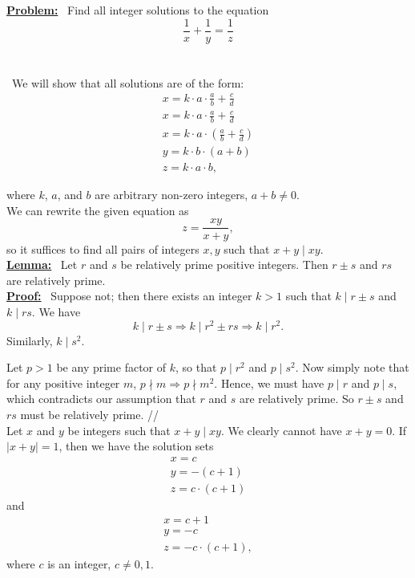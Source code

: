 \documentclass[11pt]{article}
\begin{document}
\Large\underline{\textbf{Problem:}} \ Find all integer solutions to the equation
$$ \frac{1}{x} + \frac{1}{y} = \frac{1}{z} $$
\\
\\

\noindent \ We will show that all solutions are of the form:
\begin{eqnarray}
	x = k \cdot a \cdot \displaystyle \frac{a}{b} + \frac{c}{d} \\
	x = k \cdot a \cdot \displaystyle \frac{a}{b} + \frac{c}{d} \\
	x = k \cdot a \cdot \displaystyle (\frac{a}{b} + \frac{c}{d}) \\
	y = k \cdot b \cdot \left(a + b\right) \\
	z = k \cdot a \cdot b,
\end{eqnarray} 

\noindent where $k$, $a$, and $b$ are arbitrary non-zero integers, $a+b\neq0$. \\

\noindent  We can rewrite the given equation as
$$ z = \frac{xy}{x+y}, $$
so it suffices to find all pairs of integers $ x, y $ such that $x+y \mid xy$. \\

\noindent  \underline{\textbf{Lemma:}} \ Let $r$ and $s$ be relatively prime positive integers.  Then $r\pm s$ and $rs$ are relatively prime. \\

\noindent  \underline{\textbf{Proof:}} \ Suppose not; then there exists an integer $k > 1$ such that $k \mid r\pm s$ and $k \mid rs$.  We have \\  

\noindent  \[ k \mid r \pm s \Rightarrow k \mid r^2 \pm rs \Rightarrow k \mid r^2. \]
Similarly, $ k \mid s^2. $

Let $p > 1$ be any prime factor of $k$, so that $p \mid r^2$ and $p \mid s^2$.  
Now simply note that for any positive integer $m$, $ p \nmid m \Rightarrow p \nmid m^2$. 
Hence, we must have $p \mid r$ and $p \mid s$, which contradicts our assumption that $r$ and $s$ are relatively prime.  So $r \pm s$ and $rs$ must be relatively prime. // \\

Let $x$ and $y$ be integers such that $x+y \mid xy$.  We clearly cannot have $x+y = 0$.
If $\left|x+y\right| = 1$, then we have the solution sets
$$ \begin{array}{l}
	x = c \\
	y = -\left(c + 1\right) \\
	z = c\cdot\left(c+1\right)
\end{array} $$
and
$$ \begin{array}{l}
	x = c+1 \\
	y = -c \\
	z = -c\cdot\left(c+1\right),
\end{array} $$
where $c$ is an integer, $c \neq 0, 1$.
\end{document}
